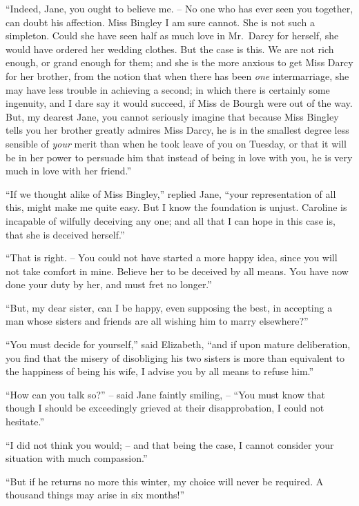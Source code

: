 “Indeed, Jane, you ought to believe me. -- No one who
has ever seen you together, can doubt his affection. Miss
Bingley I am sure cannot. She is not such a simpleton.
Could she have seen half as much love in Mr.\ Darcy for
herself, she would have ordered her wedding clothes. But
the case is this. We are not rich enough, or grand enough
for them; and she is the more anxious to get Miss Darcy
for her brother, from the notion that when there has been
\textit{one} intermarriage, she may have less trouble in achieving
a second; in which there is certainly some ingenuity, and
I dare say it would succeed, if Miss de Bourgh were out
of the way. But, my dearest Jane, you cannot seriously
imagine that because Miss Bingley tells you her brother
greatly admires Miss Darcy, he is in the smallest degree
less sensible of \textit{your} merit than when he took leave of you
on Tuesday, or that it will be in her power to persuade
him that instead of being in love with you, he is very
much in love with her friend.”

“If we thought alike of Miss Bingley,” replied Jane,
“your representation of all this, might make me quite
easy. But I know the foundation is unjust. Caroline is
incapable of wilfully deceiving any one; and all that
I can hope in this case is, that she is deceived herself.”

“That is right. -- You could not have started a more
happy idea, since you will not take comfort in mine.
Believe her to be deceived by all means. You have now
done your duty by her, and must fret no longer.”

“But, my dear sister, can I be happy, even supposing
the best, in accepting a man whose sisters and friends are
all wishing him to marry elsewhere?”

“You must decide for yourself,” said Elizabeth, “and
if upon mature deliberation, you find that the misery of
disobliging his two sisters is more than equivalent to the
happiness of being his wife, I advise you by all means
to refuse him.”

“How can you talk so?” -- said Jane faintly smiling, -- “You
must know that though I should be exceedingly
grieved at their disapprobation, I could not hesitate.”

“I did not think you would; -- and that being the case,
I cannot consider your situation with much compassion.”

“But if he returns no more this winter, my choice will
never be required. A thousand things may arise in six
months!”

